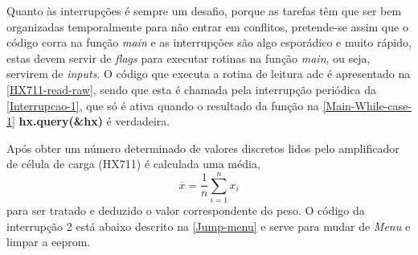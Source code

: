 \newpage
Quanto às interrupções é sempre um desafio, porque as tarefas têm que ser bem organizadas temporalmente para não entrar em conflitos, pretende-se assim que o código corra na função \textit{main} e as interrupções são algo esporádico e muito rápido, estas devem servir de \textit{flags} para executar rotinas na função \textit{main}, ou seja, servirem de \textit{inputs}. %
\emptyline
O código que executa a rotina de leitura \acs{adc} é apresentado na \autoref{HX711-read-raw}, sendo que esta é chamada pela interrupção periódica da \autoref{Interrupcao-1}, que só é ativa quando o resultado da função na \autoref{Main-While-case-1} \textbf{hx.query(\&hx)} é verdadeira.
\emptyline
{
	
}
{
	
}
\newpage
{
	
}
Após obter um número determinado de valores discretos lidos pelo amplificador de célula de carga (HX711) é calculada uma média,
\begin{equation}
	\label{eq:Mean}
	\overline{x}  =  \frac{1}{n}\sum_{i=1}^n x_i
\end{equation}
para ser tratado e deduzido o valor correspondente do peso.
\newpage
O código da interrupção 2 está abaixo descrito na \autoref{Jump-menu} e serve para mudar de \textit{Menu} e limpar a \acs{eeprom}.
{
	
}
